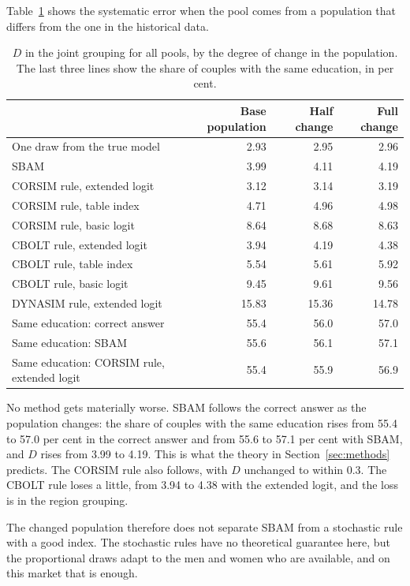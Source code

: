 \documentclass[12pt,a4paper]{article}
\begin{document}
Table~\ref{tab:change} shows the systematic error when the pool comes from a population that
differs from the one in the historical data.

\begin{table}[H]
\centering
\caption{$D$ in the joint grouping for all pools, by the degree of change in the population. The
last three lines show the share of couples with the same education, in per cent.}
\label{tab:change}
\small
\begin{tabular}{@{}l rrr@{}}
\toprule
 & Base population & Half change & Full change \\
\midrule
One draw from the true model & 2.93 & 2.95 & 2.96 \\
SBAM & 3.99 & 4.11 & 4.19 \\
CORSIM rule, extended logit & 3.12 & 3.14 & 3.19 \\
CORSIM rule, table index & 4.71 & 4.96 & 4.98 \\
CORSIM rule, basic logit & 8.64 & 8.68 & 8.63 \\
CBOLT rule, extended logit & 3.94 & 4.19 & 4.38 \\
CBOLT rule, table index & 5.54 & 5.61 & 5.92 \\
CBOLT rule, basic logit & 9.45 & 9.61 & 9.56 \\
DYNASIM rule, extended logit & 15.83 & 15.36 & 14.78 \\
\addlinespace
Same education: correct answer & 55.4 & 56.0 & 57.0 \\
Same education: SBAM & 55.6 & 56.1 & 57.1 \\
Same education: CORSIM rule, extended logit & 55.4 & 55.9 & 56.9 \\
\bottomrule
\end{tabular}
\end{table}

No method gets materially worse. SBAM follows the correct answer as the population changes: the
share of couples with the same education rises from 55.4 to 57.0 per cent in the correct answer
and from 55.6 to 57.1 per cent with SBAM, and $D$ rises from 3.99 to 4.19. This is what the
theory in Section~\ref{sec:methods} predicts. The CORSIM rule also follows, with $D$ unchanged
to within 0.3. The CBOLT rule loses a little, from 3.94 to 4.38 with the extended logit, and
the loss is in the region grouping.

The changed population therefore does not separate SBAM from a stochastic rule with a good index.
The stochastic rules have no theoretical guarantee here, but the proportional draws adapt to the
men and women who are available, and on this market that is enough.
\end{document}
